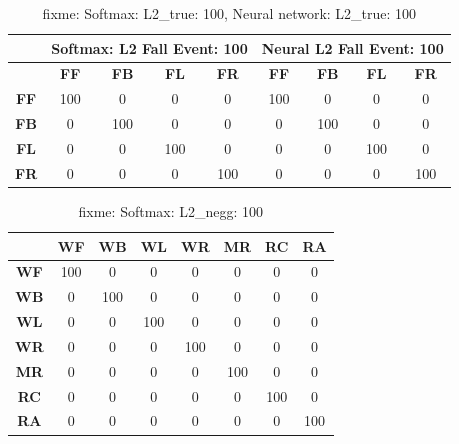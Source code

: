 \documentclass{IEEEtran}
\begin{document}
\begin{table}
\caption{fixme: Softmax: L2\_true: 100, Neural network: L2\_true: 100}
{
\begin{tabular}{|c|c|c|c|c||c|c|c|c|}
\hline 
& \multicolumn{4}{c||}{\bf Softmax: L2 Fall Event: 100} & \multicolumn{4}{c|}{\bf Neural 
L2 Fall Event: 100} \\ \hline
& \textbf{FF} & \textbf{FB}  & \textbf{FL} & \textbf{FR} & \textbf{FF} & \textbf{FB}  & 
\textbf{FL} & \textbf{FR} \\ \hline
\textbf{FF} & 100 &  0 &  0 &  0  & 100 &  0 &  0 &  0\\ \hline
\textbf{FB} & 0 &  100 &  0 &  0  & 0 &  100 &  0 &  0\\ \hline
\textbf{FL} & 0 &  0 &  100 &  0  & 0 &  0 &  100 &  0\\ \hline
\textbf{FR} & 0 &  0 &  0 &  100  & 0 &  0 &  0 &  100 \\ \hline
\end{tabular}
}
\end{table}

\begin{table}
\caption{fixme: Softmax: L2\_negg: 100}
{
\begin{tabular}{|c|c|c|c|c|c|c|c|}
\hline 
 & \textbf{WF} & \textbf{WB} & \textbf{WL} & \textbf{WR} & \textbf{MR} & 
\textbf{RC} & \textbf{RA} \\ \hline    
\textbf{WF} & 100 &  0 &  0 &  0 &  0 &  0 &  0 \\ \hline
\textbf{WB} & 0 &  100 &  0 &  0 &  0 &  0 &  0 \\ \hline
\textbf{WL} & 0 &  0 &  100 &  0 &  0 &  0 &  0 \\ \hline
\textbf{WR} & 0 &  0 &  0 &  100 &  0 &  0 &  0 \\ \hline
\textbf{MR} & 0 &  0 &  0 &  0 &  100 &  0 &  0 \\ \hline
\textbf{RC} & 0 &  0 &  0 &  0 &  0 &  100 &  0 \\ \hline
\textbf{RA} & 0 &  0 &  0 &  0 &  0 &  0 &  100 \\ \hline
\end{tabular}
}
\end{table}
\end{document}
